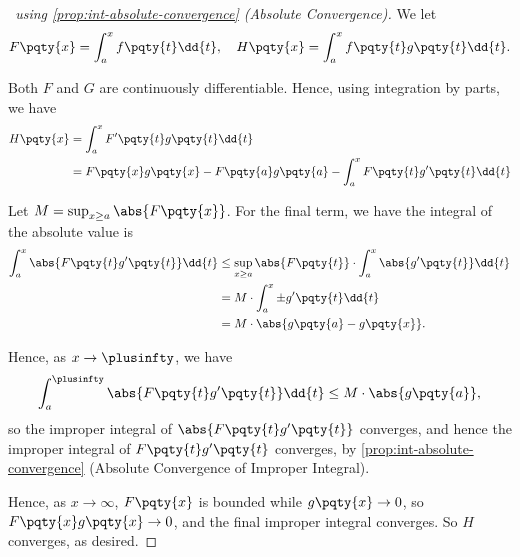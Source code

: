 \begin{proof}[\proofname\ using \autoref{prop:int-absolute-convergence} (Absolute Convergence)]
    We let
    \[
        F\pqty{x} = \int_{a}^{x} f\pqty{t} \dd{t}, \quad H\pqty{x} = \int_{a}^{x} f\pqty{t} g\pqty{t} \dd{t}.
    \]

    Both \(F\) and \(G\) are continuously differentiable. Hence, using  integration by parts, we have
    \begin{align*}
        H\pqty{x} &= \int_{a}^{x} F'\pqty{t} g\pqty{t} \dd{t} \\
        &= F\pqty{x} g\pqty{x} - F\pqty{a} g\pqty{a} - \int_{a}^{x} F\pqty{t} g'\pqty{t} \dd{t}
    \end{align*}

    Let \(M = \sup_{x \geq a} \abs{F\pqty{x}}\). For the final term, we have the integral of the absolute value is
    \begin{align*}
        \int_{a}^{x} \abs{F\pqty{t} g'\pqty{t}} \dd{t} &\leq \sup_{x \geq a} \abs{F\pqty{t}} \cdot \int_{a}^{x} \abs{g'\pqty{t}} \dd{t} \\
        &= M \cdot \int_{a}^{x} \pm g'\pqty{t} \dd{t} \\
        &= M \cdot \abs{g\pqty{a} - g\pqty{x}}.
    \end{align*}

    Hence, as \(x \to \plusinfty\), we have
    \[
        \int_{a}^{\plusinfty} \abs{F\pqty{t} g'\pqty{t}} \dd{t} \leq M \cdot \abs{g\pqty{a}},
    \]
    so the improper integral of  \(\abs{F\pqty{t} g'\pqty{t}}\) converges, and hence the improper integral of \(F\pqty{t} g'\pqty{t}\) converges, by \autoref{prop:int-absolute-convergence} (Absolute Convergence of Improper Integral).

    Hence, as \(x \to \infty\), \(F\pqty{x}\) is bounded while \(g\pqty{x} \to 0\), so \(F\pqty{x} g\pqty{x} \to 0\), and the final improper integral converges. So \(H\) converges, as desired.
\end{proof}

